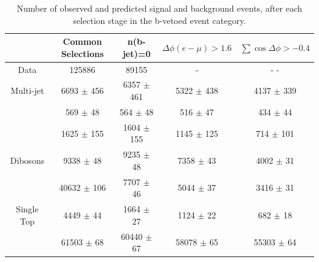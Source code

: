 \begin{table}[!tp]
  \centering
   \begin{footnotesize}	
  \begin{tabular}{ccccc}
    \hline\hline
	&	Common Selections			&	n(b-jet)=0			&	$\Delta\phi(e-\mu)>1.6$			&	$\sum\cos\Delta\phi > -0.4$ 		\\	
    \hline
   \hline
Data	&	125886			&	89155			&	-			&	-				-			\\
   \hline
Multi-jet	&	6693	$\pm$	456	&	6357	$\pm$	461	&	5322	$\pm$	438	&	4137	$\pm$	339	\\
\Zll 	&	569	$\pm$	48	&	564	$\pm$	48	&	516	$\pm$	47	&	434	$\pm$	44		\\
\Wlnu	&	1625	$\pm$	155	&	1604	$\pm$	155	&	1145	$\pm$	125	&	714	$\pm$	101		\\
Dibosons	&	9338	$\pm$	48	&	9235	$\pm$	48	&	7358	$\pm$	43	&	4002	$\pm$	31		\\
\ttbar	&	40632	$\pm$	106	&	7707	$\pm$	46	&	5044	$\pm$	37	&	3416	$\pm$	31		\\
Single Top	&	4449	$\pm$	44	&	1664	$\pm$	27	&	1124	$\pm$	22	&	682	$\pm$	18	\\
\Ztautau	&	61503	$\pm$	68	&	60440	$\pm$	67	&	58078	$\pm$	65	&	55303	$\pm$	64	\\
    \hline
  \end{tabular}
  \caption{Number of observed and predicted signal and background events, after each selection stage in the b-vetoed event category.}
  \label{tab:eventsel:bveto}
   \end{footnotesize}	
\end{table}

